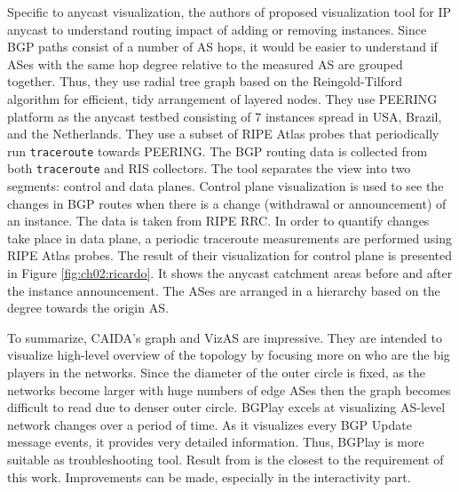 Specific to anycast visualization, the authors of \cite{github-anycast} proposed visualization tool for IP anycast to understand routing impact of adding or removing instances. Since BGP paths consist of a number of AS hops, it would be easier to understand if ASes with the same hop degree relative to the measured AS are grouped together. Thus, they use radial tree graph based on the Reingold-Tilford algorithm \cite{1702828} for efficient, tidy arrangement of layered nodes. They use PEERING platform \cite{peering} as the anycast testbed consisting of 7 instances spread in USA, Brazil, and the Netherlands. They use a subset of RIPE Atlas probes that periodically run \texttt{traceroute} towards PEERING. The BGP routing data is collected from both \texttt{traceroute} and RIS collectors. The tool separates the view into two segments: control and data planes. Control plane visualization is used to see the changes in BGP routes when there is a change (withdrawal or announcement) of an instance. The data is taken from RIPE RRC. In order to quantify changes take place in data plane, a periodic traceroute measurements are performed using RIPE Atlas probes. The result of their visualization for control plane is presented in Figure \ref{fig:ch02:ricardo}. It shows the anycast catchment areas before and after the instance announcement. The ASes are arranged in a hierarchy based on the degree towards the origin AS.  

To summarize, CAIDA's graph and VizAS are impressive. They are intended to visualize high-level overview of the topology by focusing more on who are the big players in the networks. Since the diameter of the outer circle is fixed, as the networks become larger with huge numbers of edge ASes then the graph becomes difficult to read due to denser outer circle. BGPlay excels at visualizing AS-level network changes over a period of time. As it visualizes every BGP Update message events, it provides very detailed information. Thus, BGPlay is more suitable as troubleshooting tool. Result from \cite{github-anycast} is the closest to the requirement of this work. Improvements can be made, especially in the interactivity part.

